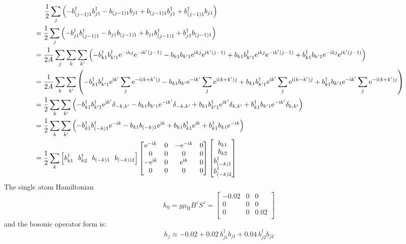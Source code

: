 \documentclass[letterpaper,10pt]{article}
\newcommand{\e}{\mathrm{e}}
\newcommand{\ii}{\mathrm{i}}
\begin{document}
$$\begin{aligned}
    & \indent  \frac{1}{2}\sum_{j}\left(-b_{(j-1)1}^{\dagger}b_{j1}^{\dagger}-b_{(j-1)1}b_{j1}+b_{(j-1)1}b_{j1}^{\dagger}+b_{(j-1)1}^{\dagger}b_{j1}\right)\\
    &= \frac{1}{2}\sum_{j}\left(-b_{j1}^{\dagger}b_{(j-1)1}^{\dagger}-b_{j1}b_{(j-1)1}+b_{j1}b_{(j-1)1}^{\dagger}+b_{j1}^{\dagger}b_{(j-1)1}\right)\\
    &=\frac{1}{2A}\sum_{j}\sum_{k}\sum_{k'}\left(-b_{k1}^{\dagger}b_{k'1}^{\dagger}\e^{-\ii kj}\e^{-\ii k'(j-1)}-b_{k1}b_{k'1}\e^{\ii kj}\e^{\ii k'(j-1)}+b_{k1}b_{k'1}^{\dagger}\e^{\ii kj}\e^{-\ii k'(j-1)}+b_{k1}^{\dagger}b_{k'1}\e^{-\ii kj}\e^{\ii k'(j-1)}\right)\\
    &=\frac{1}{2A}\sum_{k}\sum_{k'}\left(-b_{k1}^{\dagger}b_{k'1}^{\dagger}\e^{\ii k'}\sum_j \e^{-\ii (k+k')j}-b_{k1}b_{k'}\e^{-\ii k'}\sum_j \e^{\ii (k+k')j}+b_{k1}b_{k'1}^{\dagger}\e^{\ii k'}\sum_j \e^{\ii (k-k')j}+b_{k1}^{\dagger}b_{k'1}\e^{-\ii k'}\sum_j \e^{-\ii (k+k')j}\right)\\
    &=\frac{1}{2}\sum_k\sum_{k'}\left(-b_{k1}^{\dagger}b_{k'1}^{\dagger}\e^{\ii k'}\delta_{-k,k'}-b_{k1}b_{k'1}\e^{-\ii k'}\delta_{-k,k'}+b_{k1}b_{k'1}^{\dagger}\e^{\ii k'}\delta_{k,k'}+b_{k1}^{\dagger}b_{k'1}\e^{-\ii k'}\delta_{k,k'}\right)\\
    &=\frac{1}{2}\sum_k\sum_{k'}\left(-b_{k1}^{\dagger}b_{(-k)1}^{\dagger}\e^{-\ii k}-b_{k1}b_{(-k)1}\e^{\ii k}+b_{k1}b_{k1}^{\dagger}\e^{\ii k}+b_{k1}^{\dagger}b_{k1}\e^{-\ii k}\right)\\
    &=\frac{1}{2}\sum_k \left[
      b_{k1}^{\dagger} \ \ 
      b_{k2}^{\dagger}\  \ 
      b_{(-k)1}\ \ 
      b_{(-k))2}\right]
     \begin{bmatrix}
          \e^{-\ii k} & 0 & -\e^{-\ii k} & 0 \\
         0 &  0 & 0 &0 \\
         -\e^{\ii k} &  0 & \e^{\ii k} &0\\
          0 & 0 & 0& 0
          \end{bmatrix}\begin{bmatrix}
              b_{k1}  \\
              b_{k2}  \\
              b_{(-k)1}^{\dagger}\\
              b_{(-k)2}^{\dagger}
              \end{bmatrix}
  \end{aligned}
  $$
The single atom Hamiltonian $$
h_0=g\mu_{\mathrm{B}} B^z S^z=\begin{bmatrix}
    -0.02 & 0 & 0 \\
   0 &  0 & 0  \\
  0 &  0 & 0.02 \\
    \end{bmatrix}
$$
and the bosonic operator form is:$$
h_{j}\approx-0.02+0.02\ b_{j1}^{\dagger}b_{j1}+0.04\ b_{j2}^{\dagger}b_{j2}
$$
\end{document}
